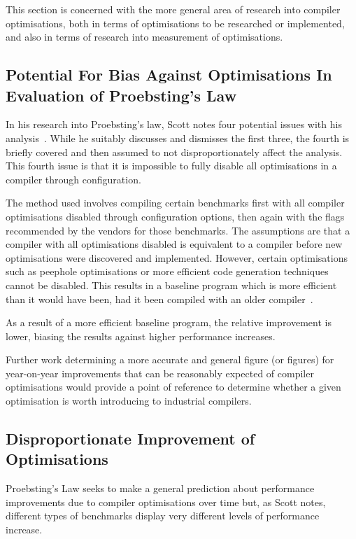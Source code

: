 This section is concerned with the more general area of research into compiler optimisations, both in terms of optimisations to be researched or implemented, and also in terms of research into measurement of optimisations.

\subsection{Potential For Bias Against Optimisations In Evaluation of Proebsting's Law}

In his research into Proebsting's law, Scott notes four potential issues with his analysis~\cite{proebstingformal}. While he suitably discusses and dismisses the first three, the fourth is briefly covered and then assumed to not disproportionately affect the analysis. This fourth issue is that it is impossible to fully disable all optimisations in a compiler through configuration.

The method used involves compiling certain benchmarks first with all compiler optimisations disabled through configuration options, then again with the flags recommended by the vendors for those benchmarks. The assumptions are that a compiler with all optimisations disabled is equivalent to a compiler before new optimisations were discovered and implemented. However, certain optimisations such as peephole optimisations or more efficient code generation techniques cannot be disabled. This results in a baseline program which is more efficient than it would have been, had it been compiled with an older compiler~\cite{proebstingformal}.

As a result of a more efficient baseline program, the relative improvement is lower, biasing the results against higher performance increases.

Further work determining a more accurate and general figure (or figures) for year-on-year improvements that can be reasonably expected of compiler optimisations would provide a point of reference to determine whether a given optimisation is worth introducing to industrial compilers.

\subsection{Disproportionate Improvement of Optimisations}

Proebsting's Law seeks to make a general prediction about performance improvements due to compiler optimisations over time but, as Scott notes, different types of benchmarks display very different levels of performance increase.

